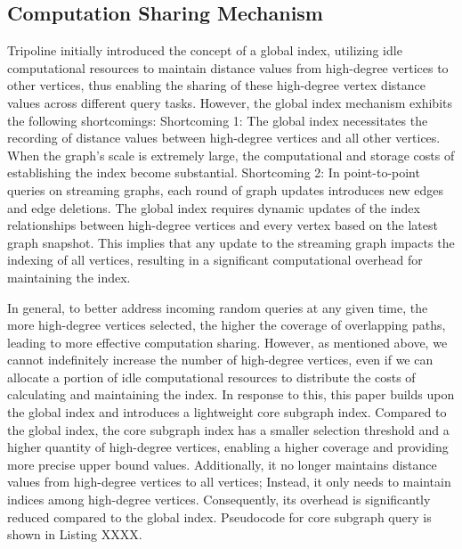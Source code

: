 \documentclass[lettersize,journal]{IEEEtran} %
\begin{document}
\subsection{Computation Sharing Mechanism}
Tripoline initially introduced the concept of a global index, utilizing idle computational resources to maintain distance values from high-degree vertices to other vertices, thus enabling the sharing of these high-degree vertex distance values across different query tasks. However, the global index mechanism exhibits the following shortcomings:  Shortcoming 1: The global index necessitates the recording of distance values between high-degree vertices and all other vertices. When the graph's scale is extremely large, the computational and storage costs of establishing the index become substantial. Shortcoming 2: In point-to-point queries on streaming graphs, each round of graph updates introduces new edges and edge deletions. The global index requires dynamic updates of the index relationships between high-degree vertices and every vertex based on the latest graph snapshot. This implies that any update to the streaming graph impacts the indexing of all vertices, resulting in a significant computational overhead for maintaining the index.

In general, to better address incoming random queries at any given time, the more high-degree vertices selected, the higher the coverage of overlapping paths, leading to more effective computation sharing. However, as mentioned above, we cannot indefinitely increase the number of high-degree vertices, even if we can allocate a portion of idle computational resources to distribute the costs of calculating and maintaining the index. In response to this, this paper builds upon the global index and introduces a lightweight core subgraph index. Compared to the global index, the core subgraph index has a smaller selection threshold and a higher quantity of high-degree vertices, enabling a higher coverage and providing more precise upper bound values. Additionally, it no longer maintains distance values from high-degree vertices to all vertices; Instead, it only needs to maintain indices among high-degree vertices. Consequently, its overhead is significantly reduced compared to the global index. Pseudocode for core subgraph query is shown in Listing XXXX.
\end{document}
